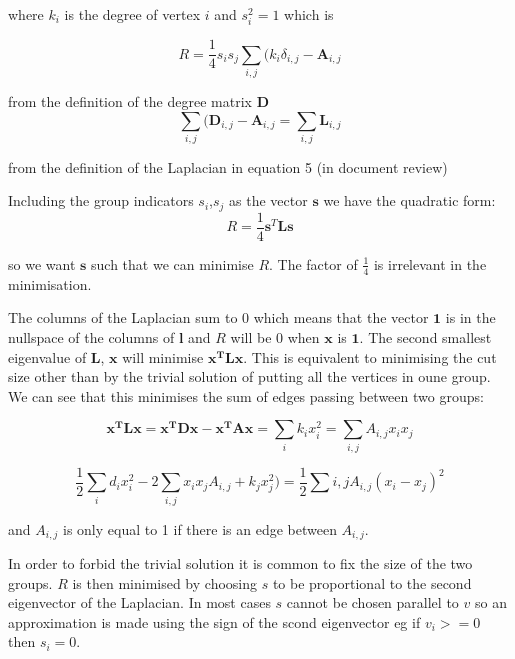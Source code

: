 where $k_i$ is the degree of vertex $i$ and $s_i^2 = 1$ which is

\begin{equation}
R = \frac{1}{4}s_i s_j \sum_{i,j}(k_i \delta_{i,j} - \mathbf{A}_{i,j}
\end{equation}


from the definition of the degree matrix $\mathbf{D}$
\begin{equation}
\sum_{i,j} (\mathbf{D}_{i,j} -\mathbf{A}_{i,j} = \sum_{i,j} \mathbf{L}_{i,j}
\end{equation}

from the definition of the Laplacian in equation 5 (in document review)

Including the group indicators $s_i$,$s_j$ as the vector $\mathbf{s}$ we have the quadratic form:
\begin{equation}
R=\frac{1}{4}\mathbf{s}^T\mathbf{L}\mathbf{s}
\end{equation}

so we want $\mathbf{s}$ such that we can minimise $R$. The factor of $\frac{1}{4}$ is irrelevant in the minimisation.

The columns of the Laplacian sum to 0 which means that the vector $\mathbf{1}$ is in the nullspace of the columns of $\mathbf{l}$ and $R$ will be 0 when $\mathbf{x}$ is $\mathbf{1}$. The second smallest eigenvalue of $\mathbf{L}$, $\mathbf{x}$ will minimise $\mathbf{x^T}\mathbf{L}\mathbf{x}$.
This is equivalent to minimising the cut size other than by the trivial solution of putting all the vertices in oune group. We can see that this minimises the sum of edges passing between two groups:

\begin{equation}
\mathbf{x^T}\mathbf{L}\mathbf{x}=\mathbf{x^T}\mathbf{D}\mathbf{x}-\mathbf{x^T}\mathbf{A}\mathbf{x}=\sum_i k_i x_i^2 = \sum_{i,j} A_{i,j}x_i x_j
\end{equation}

\begin{equation}
\frac{1}{2}\sum_i d_i x_i^2 - 2 \sum_{i,j} x_i x_j A_{i,j} + k_jx_j^2)=\frac{1}{2}\sum{i,j}A_{i,j}(x_i - x_j)^2
\end{equation}

and $A_{i,j}$ is only equal to 1 if there is an edge between $A_{i,j}$.

In order to forbid the trivial solution it is common to fix the size of the two groups. $R$ is then minimised by choosing $s$ to be proportional to the second eigenvector of the Laplacian. In most cases $s$ cannot be chosen parallel to $v$ so an approximation is made using the sign of the scond eigenvector eg if $v_i>=0$ then $s_i=0$.

